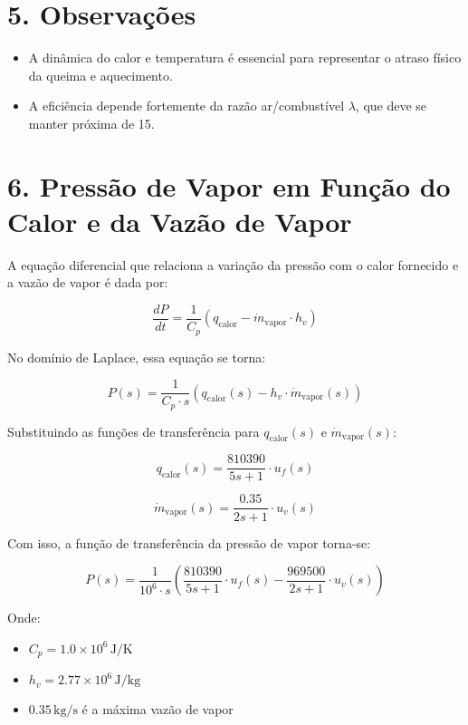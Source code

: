 \documentclass[12pt]{article}
\begin{document}
\section*{5. Observa\c{c}\~oes}
\begin{itemize}
    \item A din\^amica do calor e temperatura \'e essencial para representar o atraso f\'isico da queima e aquecimento.
    \item A efici\^encia depende fortemente da raz\~ao ar/combust\'ivel \(\lambda\), que deve se manter pr\'oxima de 15.
\end{itemize}

\section*{6. Press\~ao de Vapor em Fun\c{c}\~ao do Calor e da Vaz\~ao de Vapor}

A equa\c{c}\~ao diferencial que relaciona a varia\c{c}\~ao da press\~ao com o calor fornecido e a vaz\~ao de vapor \'e dada por:

\[
\frac{dP}{dt} = \frac{1}{C_p} \left( q_{\text{calor}} - \dot{m}_{\text{vapor}} \cdot h_v \right)
\]

No dom\'inio de Laplace, essa equa\c{c}\~ao se torna:

\[
P(s) = \frac{1}{C_p \cdot s} \left( q_{\text{calor}}(s) - h_v \cdot \dot{m}_{\text{vapor}}(s) \right)
\]

Substituindo as fun\c{c}\~oes de transfer\^encia para \( q_{\text{calor}}(s) \) e \( \dot{m}_{\text{vapor}}(s) \):

\[
q_{\text{calor}}(s) = \frac{810390}{5s + 1} \cdot u_f(s)
\]

\[
\dot{m}_{\text{vapor}}(s) = \frac{0.35}{2s + 1} \cdot u_v(s)
\]

Com isso, a fun\c{c}\~ao de transfer\^encia da press\~ao de vapor torna-se:

\[
P(s) = \frac{1}{10^6 \cdot s} \left( \frac{810390}{5s + 1} \cdot u_f(s) - \frac{969500}{2s + 1} \cdot u_v(s) \right)
\]

Onde:
\begin{itemize}
    \item \( C_p = 1.0 \times 10^6 \, \text{J/K} \)
    \item \( h_v = 2.77 \times 10^6 \, \text{J/kg} \)
    \item \( 0.35 \, \text{kg/s} \) \'e a m\'axima vaz\~ao de vapor
\end{itemize}
\end{document}
